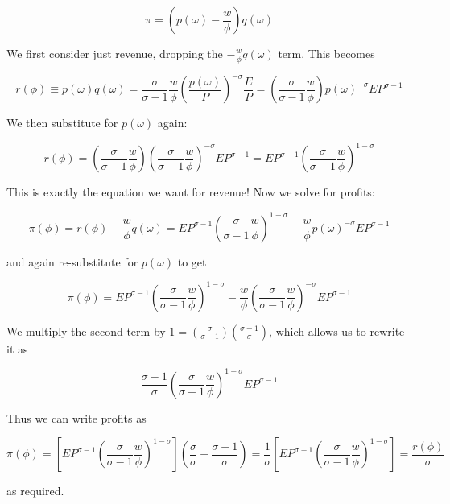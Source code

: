 \documentclass[12pt, letterpaper]{article}
\begin{document}
	\[ \pi = \left( p(\omega) - \frac{w}{\phi} \right)  q(\omega)    \]

	We first consider just revenue, dropping the \(- \frac{w}{\phi} q(\omega)\) term. This becomes

	\[ r(\phi) \equiv p(\omega) q(\omega) = \frac{\sigma}{\sigma - 1} \frac{w}{\phi} \left(\frac{p(\omega)}{P}\right)^{-\sigma} \frac{E}{P} = \left( \frac{\sigma}{\sigma - 1} \frac{w}{\phi} \right) p(\omega)^{-\sigma} EP^{\sigma - 1}   \]

	We then substitute for \(p(\omega)\) again:

	\[ r(\phi) = \left( \frac{\sigma}{\sigma - 1} \frac{w}{\phi} \right) \left( \frac{\sigma}{\sigma - 1} \frac{w}{\phi} \right)^{-\sigma} EP^{\sigma - 1} = EP^{\sigma - 1} \left( \frac{\sigma}{\sigma - 1} \frac{w}{\phi} \right)^{1 - \sigma}    \]

	This is exactly the equation we want for revenue! Now we solve for profits:

	\[ \pi(\phi) = r(\phi) - \frac{w}{\phi}  q(\omega) = EP^{\sigma - 1} \left( \frac{\sigma}{\sigma - 1} \frac{w}{\phi} \right)^{1 - \sigma} - \frac{w}{\phi} p(\omega)^{-\sigma} E P^{\sigma - 1}   \]

	and again re-substitute for \(p(\omega)\) to get 

	\[ \pi(\phi) = EP^{\sigma - 1} \left( \frac{\sigma}{\sigma - 1} \frac{w}{\phi} \right)^{1 - \sigma} - \frac{w}{\phi} \left( \frac{\sigma}{\sigma - 1} \frac{w}{\phi} \right)^{-\sigma} E P^{\sigma - 1}     \]

	We multiply the second term by \( 1 = \left(\frac{\sigma} {\sigma - 1}\right) \left(\frac{\sigma - 1} {\sigma}\right)\), which allows us to rewrite it as

	\[ \frac{\sigma - 1}{\sigma} \left( \frac{\sigma}{\sigma - 1} \frac{w}{\phi} \right)^{1-\sigma} E P^{\sigma - 1}   \]

	Thus we can write profits as 

	\[ \pi(\phi) = \left[EP^{\sigma - 1} \left( \frac{\sigma}{\sigma - 1} \frac{w}{\phi} \right)^{1 - \sigma}\right] \left( \frac{\sigma}{\sigma} - \frac{\sigma - 1}{\sigma} \right) = \frac{1}{\sigma} \left[EP^{\sigma - 1} \left( \frac{\sigma}{\sigma - 1} \frac{w}{\phi} \right)^{1 - \sigma}\right] = \frac{r(\phi)}{\sigma}    \]

	as required.

	\subsection{}
\end{document}
